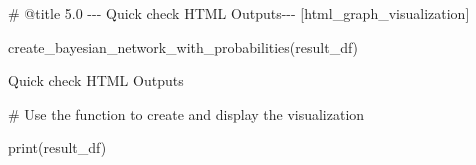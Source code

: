 \documentclass[
  11pt,
  letterpaper,
]{book}
\newenvironment{Shaded}{\begin{snugshade}}{\end{snugshade}}
\newcommand{\BuiltInTok}[1]{\textcolor[rgb]{0.00,0.23,0.31}{#1}}
\newcommand{\CommentTok}[1]{\textcolor[rgb]{0.37,0.37,0.37}{#1}}
\newcommand{\NormalTok}[1]{\textcolor[rgb]{0.00,0.23,0.31}{#1}}
\begin{document}
\begin{Shaded}
\begin{Highlighting}[]
\CommentTok{\# @title 5.0 {-}{-}{-} Quick check HTML Outputs{-}{-}{-} [html\_graph\_visualization]}

\NormalTok{create\_bayesian\_network\_with\_probabilities(result\_df)}
\end{Highlighting}
\end{Shaded}

\label{html_graph_visualization}
Quick check HTML Outputs

\begin{Shaded}
\begin{Highlighting}[]
\CommentTok{\# Use the function to create and display the visualization}

\BuiltInTok{print}\NormalTok{(result\_df)}
\end{Highlighting}
\end{Shaded}
\end{document}
